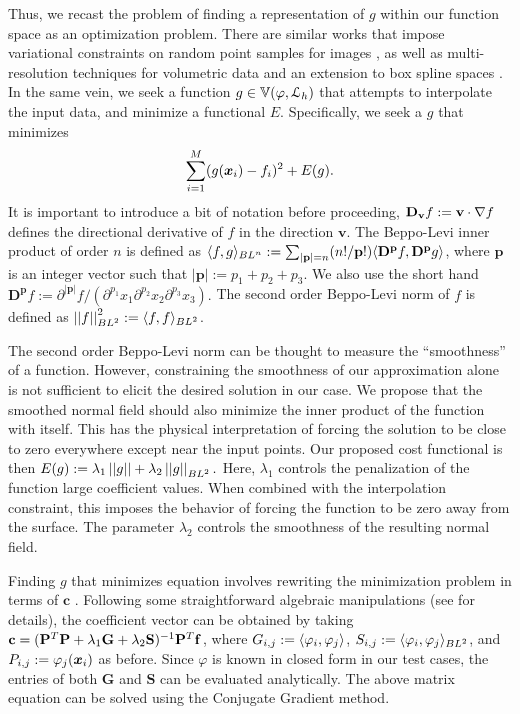 Thus, we recast the problem of finding a representation of $g$ within our function space as an optimization problem. 
There are similar works that impose variational constraints on random point samples for images \cite{variational}, as well as multi-resolution techniques for volumetric data \cite{onvari} and an extension to box spline spaces \cite{xu2012rec}. 
In the same vein, we seek a function $g \in \aspace{\lattice{L}_h}{\varphi}$ that attempts to interpolate the input data, and minimize a functional $E$. 
Specifically, we seek a $g$ that minimizes {\small 
\begin{equation} \label{eq:minexp}
 	\sump_{i=1}^{M} (g(\vx_i) -  f_i)^2 + E(g).
\end{equation}}
It is important to introduce a bit of notation before proceeding, $\dv{\mathbf{v}} f := \mathbf{v} \cdot \grad f$ defines the directional derivative of $f$ in the direction $\mathbf{v}$. 
The Beppo-Levi inner product of order $n$ is defined as $\blip{n}{f}{g}:= \sum_{|\mathbf{p}|=n}({n!}/{\mathbf{p}!}) \innerp{\mathbf{D^p}f}{\mathbf{D^p}g}$, where $\mathbf{p}$ is an integer vector such that $\left| \mathbf{p}\right| := p_1 + p_2 + p_3 $. 
We also use the short hand $\mathbf{D^p}f := \partial^{\left| \mathbf{p}\right|}f/({\partial^{p_1}x_1}{\partial^{p_2}x_2}{\partial^{p_3}x_3}).$ 
The second order Beppo-Levi norm of $f$ is defined as $\bln{2}{f}^2:=\blip{2}{f}{f}$.

The second order Beppo-Levi norm can be thought to measure the ``smoothness'' of a function. However, constraining the smoothness of our approximation alone is not sufficient to elicit the desired solution in our case. 
We propose that the smoothed normal field should also minimize the inner product of the function with itself. 
This has the physical interpretation of forcing the solution to be close to zero everywhere except near the input points. 
Our proposed cost functional is then $E(g) := \lambda_1 \left|\left|{g}\right|\right| + \lambda_2 \bln{2}{g}.$ 
Here, $\lambda_1$ controls the penalization of the function large coefficient values. 
When combined with the interpolation constraint, this imposes the behavior of forcing the function to be zero away from the surface. 
The parameter $\lambda_2$ controls the smoothness of the resulting normal field.

Finding $g$ that minimizes equation  involves rewriting the minimization problem in terms of $\mathbf{c}$ \cite{xu2012rec}. 
Following some straightforward algebraic manipulations (see \cite{xu2012rec} for details), the coefficient vector can be obtained by taking $\mathbf{c} = ( \mathbf{\Phii}^T\mathbf{\Phii} + \lambda_1\mathbf{G} + \lambda_2\mathbf{S})^{-1}\mathbf{\Phii}^T\mathbf{f}$, where $G_{i,j}:=\innerp{\varphi_i}{\varphi_j}$, $S_{i,j}:=\blip{2}{\varphi_i}{\varphi_j}$, and $P_{i,j} := \varphi_j(\vx_i)$ as before. 
Since $\varphi$ is known in closed form in our test cases, the entries of both $\mathbf{G}$ and $\mathbf{S}$ can be evaluated analytically. 
The above matrix equation can be solved using the Conjugate Gradient method.
